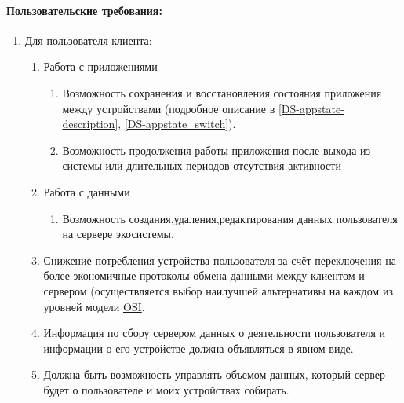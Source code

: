 \paragraph*{Пользовательские требования:}
\begin{enumerate}[label={\bfseries ПТ-\arabic*.}]
   \item Для пользователя клиента:
         \begin{enumerate}[label*={\bfseries\arabic*.}]
            \item Работа с приложениями
                  \begin{enumerate}[label*={\bfseries\arabic*.}]
                     \item Возможность сохранения и восстановления состояния приложения между устройствами (подробное описание в \ref{DS-appstate-description}, \ref{DS-appstate_switch}).
                     \item Возможность продолжения работы приложения после выхода из системы или длительных периодов отсутствия активности
                  \end{enumerate}
            \item Работа с данными
                  \begin{enumerate}[label*={\bfseries\arabic*.}]
                     \item Возможность создания,удаления,редактирования данных пользователя на сервере экосистемы.
                  \end{enumerate}
            \item Снижение потребления устройства пользователя за счёт переключения на более экономичные протоколы обмена данными между клиентом и сервером (осуществляется выбор наилучшей альтернативы на каждом из уровней модели \href{https://ru.wikipedia.org/wiki/%D0%A1%D0%B5%D1%82%D0%B5%D0%B2%D0%B0%D1%8F_%D0%BC%D0%BE%D0%B4%D0%B5%D0%BB%D1%8C_OSI#%D0%A4%D0%B8%D0%B7%D0%B8%D1%87%D0%B5%D1%81%D0%BA%D0%B8%D0%B9_%D1%83%D1%80%D0%BE%D0%B2%D0%B5%D0%BD%D1%8C}{OSI}. %
            \item Информация по сбору сервером данных о деятельности пользователя и информации о его устройстве должна объявляться в явном виде.
            \item Должна быть возможность управлять объемом данных, который сервер будет о пользователе и моих устройствах собирать.
         \end{enumerate}


\end{enumerate}
